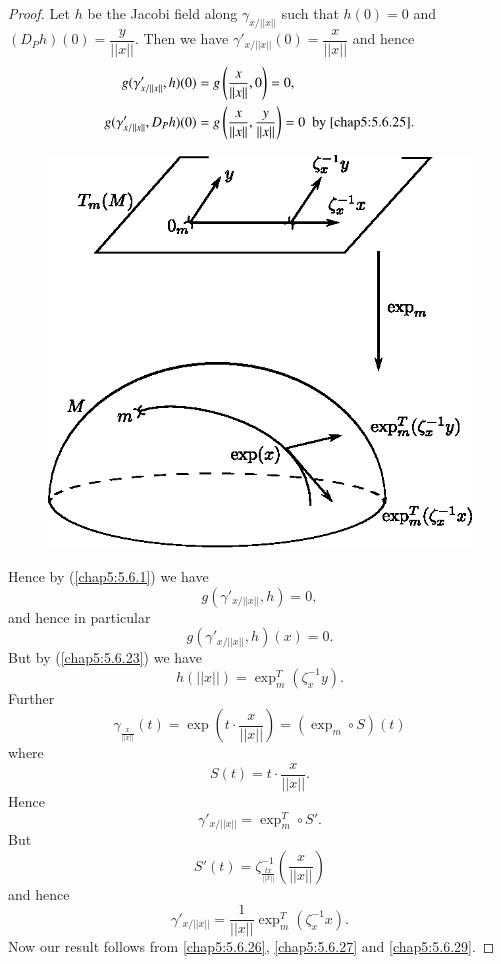 \begin{proof}
Let \pageoriginale $h$ be the Jacobi field along $\gamma_{x/||x||}$
such that $h(0)=0$ and $(D_{P}h)(0)=\dfrac{y}{||x||}$. Then we have
$\gamma'_{x/||x||}(0)=\dfrac{x}{||x||}$ and hence
\begin{align*}
g(\gamma'_{x/||x||},h)(0) &= g\left(\dfrac{x}{||x||},0\right)=0,\\
g(\gamma'_{x/||x||},D_{P}h)(0) &= g\left(\frac{x}{||x||},
\frac{y}{||x||}\right)=0\text{ \ by \eqref{chap5:5.6.25}}.
\end{align*}
\begin{figure}[H]
\centering
\includegraphics{figures/chap5-fig2.eps}
\end{figure}

\medskip
\noindent
Hence by (\ref{chap5:5.6.1}) we have
\begin{equation*}
g(\gamma'_{x/||x||},h)=0,\tag{5.6.26}\label{chap5:5.6.26}
\end{equation*}
and hence in particular
$$
g(\gamma'_{x/||x||},h)(x)=0.
$$
But by (\ref{chap5:5.6.23}) we have
\begin{equation*}
h(||x||)=\exp^{T}_{m}(\zeta^{-1}_{x}y).\tag{5.6.27}\label{chap5:5.6.27}
\end{equation*}
Further
$$
\gamma_{\frac{x}{||x||}}(t)=\exp\left(t\cdot
  \frac{x}{||x||}\right)=(\exp_{m}\circ S)(t)
$$
where\pageoriginale
$$
S(t)=t\cdot \frac{x}{||x||}.
$$
Hence
$$
\gamma'_{x/||x||}=\exp^{T}_{m}\circ S'.
$$
But
\begin{equation*}
S'(t)=\zeta^{-1}_{\frac{tx}{||x||}}\left(\frac{x}{||x||}\right)\tag{5.6.28}\label{chap5:5.6.28} 
\end{equation*}
and hence
\begin{equation*}
\gamma'_{x/||x||}=\frac{1}{||x||}\exp^{T}_{m}(\zeta^{-1}_{x}x).\tag{5.6.29}\label{chap5:5.6.29} 
\end{equation*}
Now our result follows from \eqref{chap5:5.6.26}, \eqref{chap5:5.6.27} and
\eqref{chap5:5.6.29}.


\end{proof}
